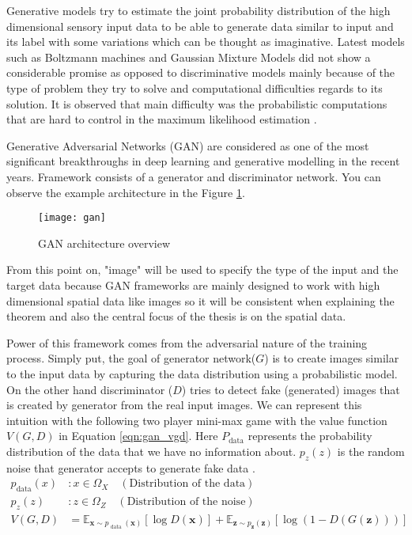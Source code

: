 {Generative models try to estimate the joint probability distribution of the high dimensional sensory 
input data to be able to generate data similar to input and its label with some variations which can be 
thought as imaginative. Latest models such as Boltzmann machines \cite{Salakhutdinov2009DeepBM} and Gaussian Mixture Models 
\cite{Reynolds2009GaussianMM} did not show a considerable promise as opposed to discriminative models mainly 
because of the type of problem they try to solve and computational difficulties regards to its solution. 
It is observed that main difficulty was the probabilistic computations that are hard to control in the maximum 
likelihood estimation \cite{Goodfellow:2014:GAN:2969033.2969125,pmlr-v5-salakhutdinov09a}.

Generative Adversarial Networks (GAN)\cite{Goodfellow:2014:GAN:2969033.2969125} are considered as one of 
the most significant breakthroughs in deep learning and generative modelling in the recent years. Framework 
consists of a generator and discriminator network. You can observe the example architecture in the Figure 
\ref{fig:gan_network}. 

\begin{figure}[h]
	\centering
	\texttt{[image: gan]}
    \caption{GAN architecture overview}
    \label{fig:gan_network}
\end{figure}

From this point on, "image" will be used to specify the type of the input and the target data because
GAN frameworks are mainly designed to work with high dimensional spatial data like images so it will
be consistent when explaining the theorem and also the central focus of the thesis is on the spatial
data. 

Power of this framework comes from the adversarial nature of the training process. Simply put,
the goal of generator network($G$) is to create images similar to the input data by capturing the
data distribution using a probabilistic model. On the other hand discriminator ($D$) tries to detect fake
(generated) images that is created by generator from the real input images. We can represent this intuition 
with the following two player mini-max game with the value function $V(G,D)$ in Equation \ref{eqn:gan_vgd}. 
Here $P_{\text{data}}$ represents the probability distribution of the data that we have no information about. 
$p_z(z)$ is the random noise that generator accepts to generate fake data 
\cite{Goodfellow:2014:GAN:2969033.2969125}.
\begin{align}
    p_{\text{data}} (x) & : x \in \Omega_{X} \quad (\text{Distribution of the data})\\[5pt]
    p_z (z) & : z \in \Omega_{Z} \quad (\text{Distribution of the noise}) \\[5pt]
    \label{eqn:gan_vgd}
    V(G, D) &= \mathbb{E}_{\boldsymbol{x} \sim p_{\text { data }}(\boldsymbol{x})}[\log D(\boldsymbol{x})]+\mathbb{E}_{\boldsymbol{z} \sim p_{\boldsymbol{z}}(\boldsymbol{z})}[\log (1-D(G(\boldsymbol{z})))]
\end{align}

}
